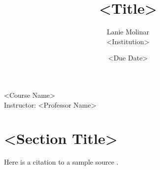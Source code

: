 \documentclass[12pt,letterpaper]{article}
\title{<Title>}
\author{Lanie Molinar\\<Institution>}
\date{<Due Date>}
\begin{document}
\maketitle

\begin{center}
<Course Name>\\
Instructor: <Professor Name>
\end{center}

\newpage

\section{<Section Title>}

Here is a citation to a sample source \parencite{smith2020}.

\newpage

\printbibliography[heading=bibintoc]
\end{document}
